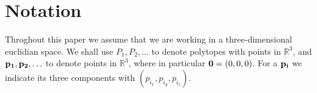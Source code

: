 \section{Notation}
Throghout this paper we assume that we are working in a three-dimensional
euclidian space. We shall use $P_1, P_2, \ldots$ to denote polytopes with
points in $\mathbb{R}^3$, and $\mathbf{p_1}, \mathbf{p_2}, \ldots$ to denote
points in $\mathbb{R}^3$, where in particular $\mathbf{0} = (0, 0, 0)$.
For a $\mathbf{p_i}$ we indicate its three components with $(p_{i_x}, p_{i_y}, p_{i_z})$.
